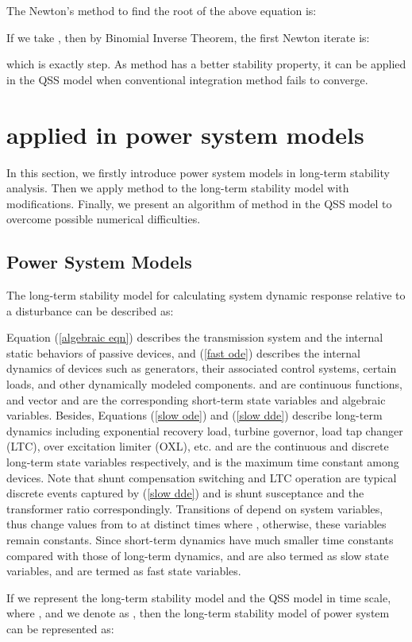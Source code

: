 \documentclass[journal]{IEEEtran}
\begin{document}
The Newton's method to find the root of the above equation is:

If we take , then by Binomial Inverse Theorem, the first Newton iterate is:

which is exactly  step. As  method has a better stability property, it can be applied in the QSS model when conventional integration method fails to converge.

\section{ applied in power system models}\label{sectionPTCinpowersystem}
In this section, we firstly introduce power system models in long-term stability analysis. Then we apply  method to the long-term stability model with modifications. Finally, we present an algorithm of  method in the QSS model to overcome possible numerical difficulties.
\subsection{Power System Models}
The long-term stability model for calculating system dynamic response relative to a disturbance can be described as:


Equation (\ref{algebraic eqn}) describes the transmission system and the internal static behaviors of passive devices, and (\ref{fast ode}) describes the internal dynamics of devices such as generators, their associated control systems, certain loads, and other dynamically modeled components.  and  are continuous functions, and vector  and  are the corresponding short-term state variables and algebraic variables. Besides, Equations (\ref{slow ode}) and (\ref{slow dde}) describe long-term dynamics including exponential recovery load, turbine governor, load tap changer (LTC), over excitation limiter (OXL), etc.  and  are the continuous and discrete long-term state variables respectively, and  is the maximum time constant among devices. Note that shunt compensation switching and LTC operation are typical discrete events captured by (\ref{slow dde}) and  is shunt susceptance and the transformer ratio correspondingly. Transitions of  depend on system variables, thus  change values from  to  at distinct times  where , otherwise, these variables remain constants. Since short-term dynamics have much smaller time constants compared with those of long-term dynamics,  and  are also termed as slow state variables, and  are termed as fast state variables.

If we represent the long-term stability model and the QSS model in  time scale, where , and we denote  as , then the long-term stability model of power system can be represented as:
\end{document}

